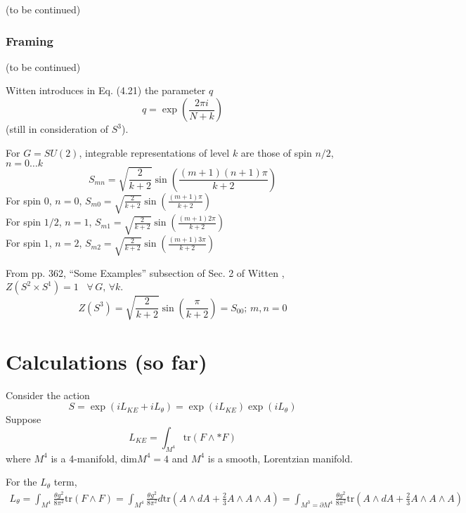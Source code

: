 \documentclass[10pt]{amsart}
\begin{document}
(to be continued)
  

  


\subsubsection{Framing}

(to be continued)


Witten introduces in Eq. (4.21) \cite{Witten:1988hf} the parameter $q$
\[
q = \exp{ \left( \frac{2\pi i }{ N + k } \right) }
\]
(still in consideration of $S^3$).

For $G=SU(2)$, integrable representations of level $k$ are those of spin $n/2$, $n=0 \dots k$
\[
S_{mn} = \sqrt{ \frac{2}{k+2} } \sin{\left( \frac{ (m+1)(n+1)\pi }{ k+2} \right) }
\]
For spin $0$, $n=0$, $S_{m0} = \sqrt{ \frac{2}{k+2} } \sin{ \left( \frac{ (m+1) \pi  }{ k+2} \right) }$  \\
For spin $1/2$, $n=1$, $S_{m1} = \sqrt{ \frac{2}{k+2} } \sin{ \left( \frac{ (m+1) 2\pi  }{ k+2} \right) }$  \\
For spin $1$, $n=2$, $S_{m2} = \sqrt{ \frac{2}{k+2} } \sin{ \left( \frac{ (m+1) 3\pi  }{ k+2} \right) }$

From pp. 362, ``Some Examples'' subsection of Sec. 2 of Witten \cite{Witten:1988hf}, $Z(S^2 \times S^1) =1$ \, $\forall \, G, \, \forall k$.
\[
Z(S^3)=\sqrt{ \frac{2}{k+2} } \sin{ \left( \frac{ \pi}{k+2} \right)} = S_{00}; \, m,n=0
\]


\section{Calculations (so far)}

Consider the action
\begin{equation}
  S = \exp{ (i L_{KE} + i L_{\theta} ) } = \exp{ (i L_{KE})} \exp{ (i L_{\theta} ) }
\end{equation}
Suppose
\[
L_{KE} = \int_{M^4} \text{tr}(F\wedge * F)
\]
where $M^4$ is a 4-manifold, $\text{dim}M^4=4$ and $M^4$ is a smooth, Lorentzian manifold.  

For the $L_{\theta}$ term,
\[
\begin{gathered}
  L_{\theta} = \int_{M^4} \frac{ \theta g^2}{8\pi^2} \text{tr}(F\wedge F) = \int_{M^4} \frac{ \theta g^2}{8 \pi^2} d\text{tr}(A\wedge dA + \frac{2}{3} A \wedge A \wedge A ) = \int_{M^3 = \partial M^4} \frac{ \theta g^2}{8 \pi^2} \text{tr}(A\wedge dA + \frac{2}{3} A\wedge A \wedge A )
  \end{gathered}
\]
\end{document}
